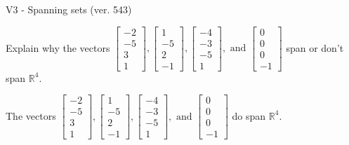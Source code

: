 \begin{exercise}
  \begin{exerciseTitle}V3 - Spanning sets (ver. 543)\end{exerciseTitle}
  \begin{exerciseStatement}
    Explain why the vectors \(\left[\begin{array}{r}
-2 \\
-5 \\
3 \\
1
\end{array}\right] , \left[\begin{array}{r}
1 \\
-5 \\
2 \\
-1
\end{array}\right] , \left[\begin{array}{r}
-4 \\
-3 \\
-5 \\
1
\end{array}\right] , \text{ and } \left[\begin{array}{r}
0 \\
0 \\
0 \\
-1
\end{array}\right]\) span or don't span \(\mathbb{R}^4\). 
	


  \end{exerciseStatement}
  \begin{exerciseAnswer}
   The vectors \(\left[\begin{array}{r}
-2 \\
-5 \\
3 \\
1
\end{array}\right] , \left[\begin{array}{r}
1 \\
-5 \\
2 \\
-1
\end{array}\right] , \left[\begin{array}{r}
-4 \\
-3 \\
-5 \\
1
\end{array}\right] , \text{ and } \left[\begin{array}{r}
0 \\
0 \\
0 \\
-1
\end{array}\right]\) 
  	 do  
	span \(\mathbb{R}^4\).
  


  \end{exerciseAnswer}
\end{exercise}